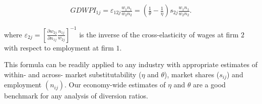 \documentclass[10 pt,a4paper]{article}
\begin{document}
\begin{align}
	GDWPI_{1j} = \varepsilon_{12j}\frac{w_{1} n_{1}}{w_{2} n_{2}} = \left(\frac{1}{\theta} - \frac{1}{\eta}\right)s_{2j} \frac{w_{1} n_{1}}{w_{2} n_{2}}.
\end{align}

where $\varepsilon_{2j}=\left[\frac{\partial w_{2j}}{\partial n_{1j}}\frac{n_{1j}}{w_{2j}}\right]^{-1}$ is the inverse of the cross-elasticity of wages at firm \(2\) with respect to employment at firm \(1\).

This formula can be readily applied to any industry with appropriate estimates of  within- and across- market substitutability ($\eta$ and $\theta$), market shares ($s_{ij}$) and employment $(n_{ij})$. Our economy-wide estimates of $\eta$ and $\theta$ are a good benchmark for any analysis of diversion ratios.
\end{document}
